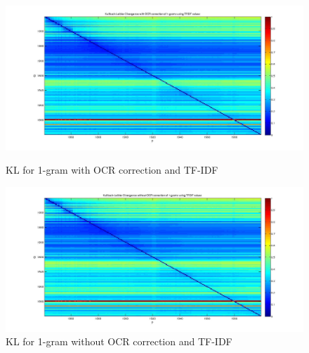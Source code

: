 \begin{figure}[h!]
    \begin{minipage}[b]{0.48\linewidth}
        \includegraphics[scale=0.15]{Pictures/kullback-leibler/KL_1-grams_with_correction_tfidf.jpg}
        \caption{KL for 1-gram with OCR correction and TF-IDF}
        \label{KL-TC1}
    \end{minipage}\hfill
    \begin{minipage}[b]{0.5\linewidth}
        \includegraphics[scale=0.15]{Pictures/kullback-leibler/KL_1-grams_without_correction_tfidf.jpg}
        \caption{KL for 1-gram without OCR correction and TF-IDF}
        \label{KL-TN1}
    \end{minipage}\hfill
\end{figure}

